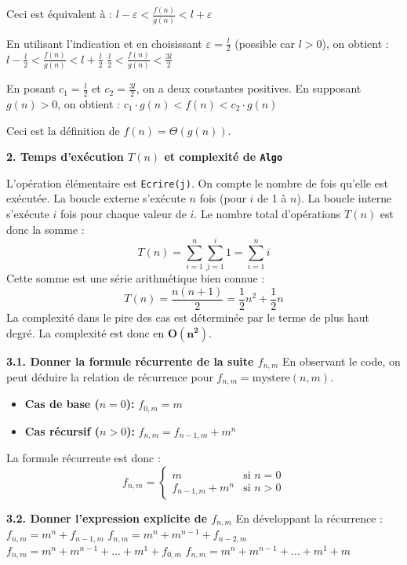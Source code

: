 \documentclass[12pt]{article}
\begin{document}
Ceci est équivalent à :
$l - \varepsilon < \frac{f(n)}{g(n)} < l + \varepsilon$

En utilisant l'indication et en choisissant $\varepsilon = \frac{l}{2}$ (possible car $l>0$), on obtient :
$l - \frac{l}{2} < \frac{f(n)}{g(n)} < l + \frac{l}{2}$
$\frac{l}{2} < \frac{f(n)}{g(n)} < \frac{3l}{2}$

En posant $c_1 = \frac{l}{2}$ et $c_2 = \frac{3l}{2}$, on a deux constantes positives. En supposant $g(n)>0$, on obtient :
$c_1 \cdot g(n) < f(n) < c_2 \cdot g(n)$

Ceci est la définition de $f(n) = \Theta(g(n))$.

\vspace{1em}
\textbf{2. Temps d'exécution $T(n)$ et complexité de \texttt{Algo}}

L'opération élémentaire est \texttt{Ecrire(j)}. On compte le nombre de fois qu'elle est exécutée.
La boucle externe s'exécute $n$ fois (pour $i$ de 1 à $n$).
La boucle interne s'exécute $i$ fois pour chaque valeur de $i$.
Le nombre total d'opérations $T(n)$ est donc la somme :
$$ T(n) = \sum_{i=1}^{n} \sum_{j=1}^{i} 1 = \sum_{i=1}^{n} i $$
Cette somme est une série arithmétique bien connue :
$$ T(n) = \frac{n(n+1)}{2} = \frac{1}{2}n^2 + \frac{1}{2}n $$
La complexité dans le pire des cas est déterminée par le terme de plus haut degré.
La complexité est donc en $\boldsymbol{O(n^2)}$.







\textbf{3.1. Donner la formule récurrente de la suite $f_{n,m}$}
En observant le code, on peut déduire la relation de récurrence pour $f_{n,m} = \text{mystere}(n,m)$.
\begin{itemize}
    \item \textbf{Cas de base ($n=0$):} $f_{0,m} = m$
    \item \textbf{Cas récursif ($n>0$):} $f_{n,m} = f_{n-1,m} + m^n$
\end{itemize}
La formule récurrente est donc :
$$ f_{n,m} = \begin{cases} m & \text{si } n = 0 \\ f_{n-1,m} + m^n & \text{si } n > 0 \end{cases} $$

\textbf{3.2. Donner l'expression explicite de $f_{n,m}$}
En développant la récurrence :
$f_{n,m} = m^n + f_{n-1,m}$
$f_{n,m} = m^n + m^{n-1} + f_{n-2,m}$
$f_{n,m} = m^n + m^{n-1} + \dots + m^1 + f_{0,m}$
$f_{n,m} = m^n + m^{n-1} + \dots + m^1 + m$
\end{document}
